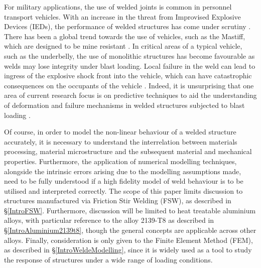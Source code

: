 For military applications, the use of welded joints is common in personnel transport vehicles. With an increase in the threat from Improvised Explosive Devices (IEDs), the performance of welded structures has come under scrutiny \cite{Ramasamy2011}. There has been a global trend towards the use of vehicles, such as the Mastiff, which are designed to be mine resistant \cite{Morse2011}. In critical areas of a typical vehicle, such as the underbelly, the use of monolithic structures has become favourable as welds may lose integrity under blast loading. Local failure in the weld can lead to ingress of the explosive shock front into the vehicle, which can have catastrophic consequences on the occupants of the vehicle \cite{Ramasamy2011}. Indeed, it is unsurprising that one area of current research focus is on predictive techniques to aid the understanding of deformation and failure mechanisms in welded structures subjected to blast loading \cite{McWilliams2013,Grujicic2011a,Grujicic2012}.

Of course, in order to model the non-linear behaviour of a welded structure accurately, it is necessary to understand the interrelation between materials processing, material microstructure and the subsequent material and mechanical properties. Furthermore, the application of numerical modelling techniques, alongside the intrinsic errors arising due to the modelling assumptions made, need to be fully understood if a high fidelity model of weld behaviour is to be utilised and interpreted correctly.
The scope of this paper limits discussion to structures manufactured via Friction Stir Welding (FSW), as described in \S\ref{IntroFSW}. Furthermore, discussion will be limited to heat treatable aluminium alloys, with particular reference to the alloy 2139-T8 as described in \S\ref{IntroAluminium2139t8}, though the general concepts are applicable across other alloys. Finally, consideration is only given to the Finite Element Method (FEM), as described in \S\ref{IntroWeldeModelling}, since it is widely used as a tool to study the response of structures under a wide range of loading conditions.

